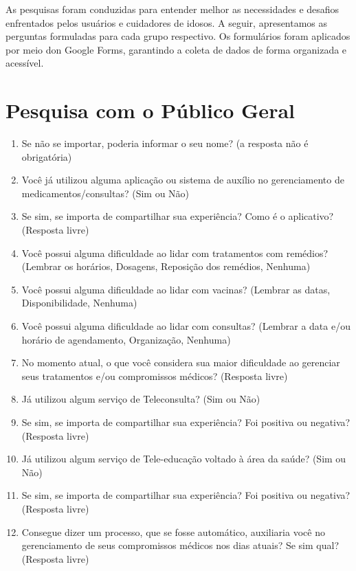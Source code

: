 As pesquisas foram conduzidas para entender melhor as necessidades e desafios enfrentados pelos usuários e cuidadores de idosos. A seguir, apresentamos as perguntas formuladas para cada grupo respectivo. Os formulários foram aplicados por meio don Google Forms, garantindo a coleta de dados de forma organizada e acessível.

\section{Pesquisa com o Público Geral}
\begin{enumerate}
    \item Se não se importar, poderia informar o seu nome? (a resposta não é obrigatória)
    \item Você já utilizou alguma aplicação ou sistema de auxílio no gerenciamento de medicamentos/consultas? (Sim ou Não)
    \item Se sim, se importa de compartilhar sua experiência? Como é o aplicativo? (Resposta livre)
    \item Você possui alguma dificuldade ao lidar com tratamentos com remédios? (Lembrar os horários, Dosagens, Reposição dos remédios, Nenhuma)
    \item Você possui alguma dificuldade ao lidar com vacinas? (Lembrar as datas, Disponibilidade, Nenhuma)
    \item Você possui alguma dificuldade ao lidar com consultas? (Lembrar a data e/ou horário de agendamento, Organização, Nenhuma)
    \item No momento atual, o que você considera sua maior dificuldade ao gerenciar seus tratamentos e/ou compromissos médicos? (Resposta livre)
    \item Já utilizou algum serviço de Teleconsulta? (Sim ou Não)
    \item Se sim, se importa de compartilhar sua experiência? Foi positiva ou negativa? (Resposta livre)
    \item Já utilizou algum serviço de Tele-educação voltado à área da saúde? (Sim ou Não)
    \item Se sim, se importa de compartilhar sua experiência? Foi positiva ou negativa? (Resposta livre)
    \item Consegue dizer um processo, que se fosse automático, auxiliaria você no gerenciamento de seus compromissos médicos nos dias atuais? Se sim qual? (Resposta livre)
\end{enumerate}

